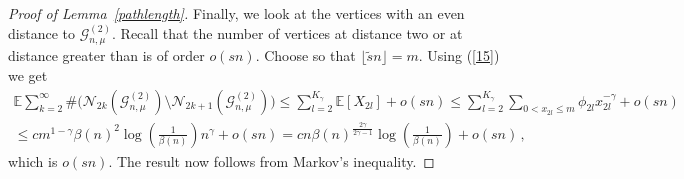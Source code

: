 \documentclass[10pt,a4paper]{amsart}
\begin{document}
\begin{proof}[Proof of Lemma~\ref{pathlength}]
 Finally, we look at the vertices with an even distance to $\mathcal G^{(2)}_{n,\mu}$. Recall that the number of vertices at distance two or at distance greater than  is of order $o(sn)$. %
 Choose  so that $\lfloor\tilde s n \rfloor= m$. Using 
 (\ref{15}) we get
\begin{align*}
    \mathbb E \sum_{k=2}^\infty \#\big(\mathcal{N}_{2k}(\mathcal G_{n,\mu}^{(2)})\setminus \mathcal{N}_{2k+1}(\mathcal G_{n,\mu}^{(2)})\big)\le   \sum_{l=2}^{K_\gamma} \mathbb{E}[X_{2l}] + o(sn) \le  \sum_{l=2}^{K_\gamma} \sum_{0<x_{2l}\le m} \phi_{2l} x_{2l}^{-\gamma} + o(sn)
    \\ \le  c m^{1-\gamma}\beta(n)^2 \log\left(\tfrac{1}{\beta(n)}\right) n ^\gamma + o(sn)= c n \beta(n)^{\tfrac{2\gamma}{2\gamma-1}}\log\left(\tfrac{1}{\beta(n)}\right)+o(sn)\,,
\end{align*}
which is $o(sn)$. 
The result now follows from Markov's inequality.
\end{proof}
\end{document}
